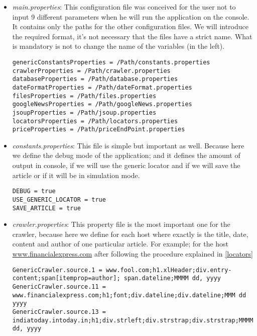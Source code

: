 \begin{itemize}
	\item \emph{main.properties}: This configuration file was conceived for the user not to input 9 different parameters when he will run the application on the console. It contains only the paths for the other configuration files. We will introduce the required format, it's not necessary that the files have a strict name. What is mandatory is not to change the name of the variables (in the left).
	
\begin{lstlisting}
genericConstantsProperties = /Path/constants.properties
crawlerProperties = /Path/crawler.properties
databaseProperties = /Path/database.properties
dateFormatProperties = /Path/dateFormat.properties
filesProperties = /Path/files.properties
googleNewsProperties = /Path/googleNews.properties
jsoupProperties = /Path/jsoup.properties
locatorsProperties = /Path/locators.properties
priceProperties = /Path/priceEndPoint.properties
\end{lstlisting}
	
	\item \emph{constants.properties}:  This file is simple but important as well. Because here we define the debug mode of the application; and it defines the amount of output in console, if we will use the generic locator and if we will save the article or if it will be in simulation mode.
	
\begin{lstlisting}
DEBUG = true
USE_GENERIC_LOCATOR = true
SAVE_ARTICLE = true
\end{lstlisting}
	
	\item \emph{crawler.properties}\label{crawlerProperties}: This property file is the most important one for the crawler, because here we define for each host where exactly is the title, date, content and author of one particular article. For example; for the host \url{www.financialexpress.com} after following the procedure explained in \ref{locators}

\begin{lstlisting}
GenericCrawler.source.1 = www.fool.com;h1.xlHeader;div.entry-content;span[itemprop=author]; span.dateline;MMMM dd, yyyy
GenericCrawler.source.11 = www.financialexpress.com;h1;font;div.dateline;div.dateline;MMM dd yyyy
GenericCrawler.source.13 = indiatoday.intoday.in;h1;div.strleft;div.strstrap;div.strstrap;MMMM dd, yyyy
\end{lstlisting}	


\end{itemize}
